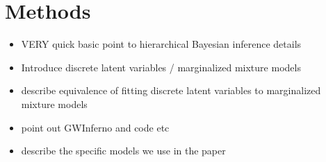 \section{Methods} \label{sec:methods}

\begin{itemize}
    \item VERY quick basic point to hierarchical Bayesian inference details
    \item Introduce discrete latent variables / marginalized mixture models
    \item describe equivalence of fitting discrete latent variables to marginalized mixture models
    \item point out GWInferno and code etc
    \item describe the specific models we use in the paper
\end{itemize}